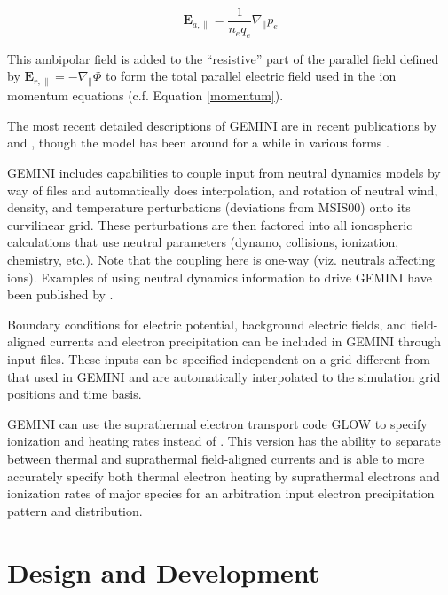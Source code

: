 \documentclass[11pt,letterpaper]{article}
\begin{document}
\begin{linenomath*} \begin{equation}
\mathbf{E}_{a,\parallel} = \frac{1}{n_e q_e} \nabla_\parallel p_e \label{ambipolar}
\end{equation} \end{linenomath*}
This ambipolar field is added to the ``resistive'' part of the parallel field defined by $\mathbf{E}_{r,\parallel} = - \nabla_\parallel \Phi$ to form the total parallel electric field used in the ion momentum equations (c.f. Equation \ref{momentum}).  

The most recent detailed descriptions of GEMINI are in recent publications by \citet[][Appendix A]{Zettergren:2015} and \citet{Zettergren:2015b}, though the model has been around for a while in various forms \citep[e.g.][]{Zettergren:2012}.  

GEMINI includes capabilities to couple input from neutral dynamics models by way of files and automatically does interpolation, and rotation of neutral wind, density, and temperature perturbations (deviations from MSIS00) onto its curvilinear grid.  These perturbations are then factored into all ionospheric calculations that use neutral parameters (dynamo, collisions, ionization, chemistry, etc.).  Note that the coupling here is one-way (viz. neutrals affecting ions).  Examples of using neutral dynamics information to drive GEMINI have been published by \citet{Zettergren:2013,Zettergren:2015,Zettergren:2017}.  

Boundary conditions for electric potential, background electric fields, and field-aligned currents and electron precipitation can be included in GEMINI through input files.  These inputs can be specified independent on a grid different from that used in GEMINI and are automatically interpolated to the simulation grid positions and time basis.  

GEMINI can use the suprathermal electron transport code GLOW to specify ionization and heating rates instead of \citet{Fang:2008,Swartz:1972}.  This version has the ability to separate between thermal and suprathermal field-aligned currents and is able to more accurately specify both thermal electron heating by suprathermal electrons and ionization rates of major species for an arbitration input electron precipitation pattern and distribution.  


\section{Design and Development}
\end{document}

